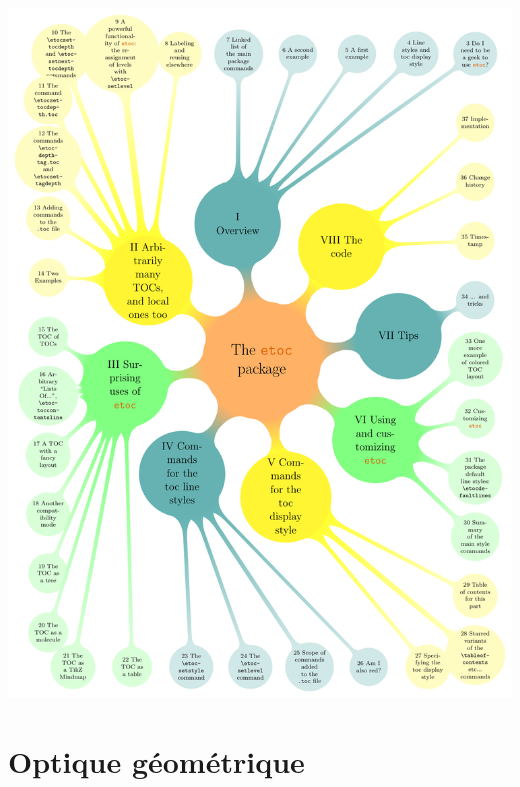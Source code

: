 \documentclass[a4paper, 10pt, garamond]{book}
\begin{document}
\begin{adjustwidth}{-1cm}{-1cm}
  \pagestyle{empty}
  \includegraphics[width=\linewidth]{cover}
\end{adjustwidth}
\newpage

\tableofcontents
\part{Optique géométrique}


% 
% 
\end{document}
